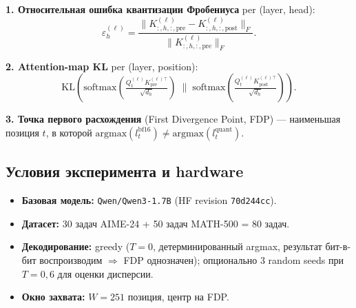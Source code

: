 \documentclass[a4paper,12pt]{article}
\begin{document}
\textbf{1. Относительная ошибка квантизации Фробениуса} per (layer, head):
\[
\varepsilon^{(\ell)}_h = \frac{\|K^{(\ell)}_{:,h,:,\text{pre}} - K^{(\ell)}_{:,h,:,\text{post}}\|_F}{\|K^{(\ell)}_{:,h,:,\text{pre}}\|_F}.
\]

\textbf{2. Attention-map KL} per (layer, position):
\[
\mathrm{KL}\!\left(\mathrm{softmax}\!\left(\tfrac{Q^{(\ell)}_t K^{(\ell)\top}_\text{pre}}{\sqrt{d_h}}\right)\;\Big\|\;\mathrm{softmax}\!\left(\tfrac{Q^{(\ell)}_t K^{(\ell)\top}_\text{post}}{\sqrt{d_h}}\right)\right).
\]

\textbf{3. Точка первого расхождения} (First Divergence Point, FDP) ---
наименьшая позиция $t$, в которой
$\mathrm{argmax}(l_t^\text{bf16}) \ne \mathrm{argmax}(l_t^\text{quant})$.

\subsection{Условия эксперимента и hardware}

\begin{itemize}[leftmargin=*]
\item \textbf{Базовая модель:} \texttt{Qwen/Qwen3-1.7B} (HF revision
  \texttt{70d244cc}).
\item \textbf{Датасет:} 30 задач AIME-24 + 50 задач MATH-500 = 80 задач.
\item \textbf{Декодирование:} greedy ($T=0$, детерминированный argmax,
  результат бит-в-бит воспроизводим $\Rightarrow$ FDP однозначен);
  опционально 3 random seeds при $T=0,6$ для оценки дисперсии.
\item \textbf{Окно захвата:} $W = 251$ позиция, центр на FDP.
\end{itemize}
\end{document}
